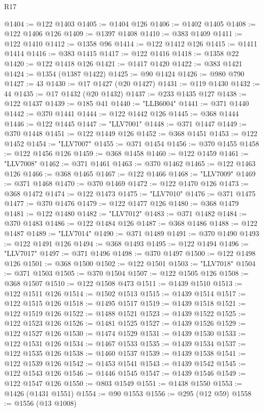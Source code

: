 \begin{lexlean}{R17}
\begin{coremodule}
@1404 := @122 @1403
@1405 := @1404 @126
@1406 := @1402 @1405
@1408 := @122 @1406 @126
@1409 := @1397 @1408
@1410 := @383 @1409
@1411 := @122 @1410
@1412 := @1358 @96
@1414 := @122 @1412 @126
@1415 := @1411 @1414
@1416 := @383 @1415
@1417 := @122 @1416
@1418 := @1358 @22
@1420 := @122 @1418 @126
@1421 := @1417 @1420
@1422 := @383 @1421
@1424 := @1354 (@1387 @1422)
@1425 := @90 @1424
@1426 := @980 @790
@1427 := 43
@1430 := @17 @1427 (@20 @1427)
@1431 := @119 @1430
@1432 := 44
@1435 := @17 @1432 (@20 @1432)
@1437 := @233 @1435 @127
@1438 := @122 @1437
@1439 := @185 @41
@1440 := "LLB6004"
@1441 := @371 @1440
@1442 := @370 @1441
@1444 := @122 @1442 @126
@1445 := @368 @1444
@1446 := @122 @1445
@1447 := "LLV7001"
@1448 := @371 @1447
@1449 := @370 @1448
@1451 := @122 @1449 @126
@1452 := @368 @1451
@1453 := @122 @1452
@1454 := "LLV7007"
@1455 := @371 @1454
@1456 := @370 @1455
@1458 := @122 @1456 @126
@1459 := @368 @1458
@1460 := @122 @1459
@1461 := "LLV7008"
@1462 := @371 @1461
@1463 := @370 @1462
@1465 := @122 @1463 @126
@1466 := @368 @1465
@1467 := @122 @1466
@1468 := "LLV7009"
@1469 := @371 @1468
@1470 := @370 @1469
@1472 := @122 @1470 @126
@1473 := @368 @1472
@1474 := @122 @1473
@1475 := "LLV7010"
@1476 := @371 @1475
@1477 := @370 @1476
@1479 := @122 @1477 @126
@1480 := @368 @1479
@1481 := @122 @1480
@1482 := "LLV7012"
@1483 := @371 @1482
@1484 := @370 @1483
@1486 := @122 @1484 @126
@1487 := @368 @1486
@1488 := @122 @1487
@1489 := "LLV7014"
@1490 := @371 @1489
@1491 := @370 @1490
@1493 := @122 @1491 @126
@1494 := @368 @1493
@1495 := @122 @1494
@1496 := "LLV7017"
@1497 := @371 @1496
@1498 := @370 @1497
@1500 := @122 @1498 @126
@1501 := @368 @1500
@1502 := @122 @1501
@1503 := "LLV7018"
@1504 := @371 @1503
@1505 := @370 @1504
@1507 := @122 @1505 @126
@1508 := @368 @1507
@1510 := @122 @1508 @473
@1511 := @1439 @1510
@1513 := @122 @1511 @126
@1514 := @1502 @1513
@1515 := @1439 @1514
@1517 := @122 @1515 @126
@1518 := @1495 @1517
@1519 := @1439 @1518
@1521 := @122 @1519 @126
@1522 := @1488 @1521
@1523 := @1439 @1522
@1525 := @122 @1523 @126
@1526 := @1481 @1525
@1527 := @1439 @1526
@1529 := @122 @1527 @126
@1530 := @1474 @1529
@1531 := @1439 @1530
@1533 := @122 @1531 @126
@1534 := @1467 @1533
@1535 := @1439 @1534
@1537 := @122 @1535 @126
@1538 := @1460 @1537
@1539 := @1439 @1538
@1541 := @122 @1539 @126
@1542 := @1453 @1541
@1543 := @1439 @1542
@1545 := @122 @1543 @126
@1546 := @1446 @1545
@1547 := @1439 @1546
@1549 := @122 @1547 @126
@1550 := @803 @1549
@1551 := @1438 @1550
@1553 := @1426 (@1431 @1551)
@1554 := @90 @1553
@1556 := @295 (@12 @59)
@1558 := @1556 (@13 @1008)

\end{coremodule}
\end{lexlean}
